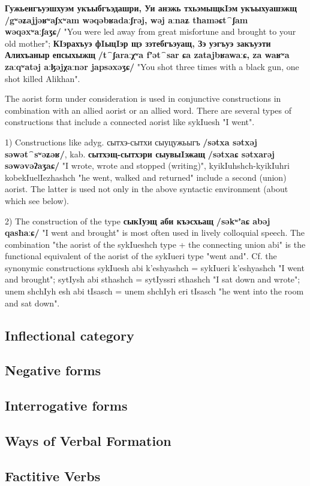 \documentclass[a4paper,12pt]{book}
\newcommand{\1}[1]{\textbf{\emph{#1}}} %
\newcommand{\2}[1]{\textbf{[#1]}} %
\newcommand{\3}[1]{\fontsize{11pt}{0cm}\textbf{\emph{#1}}} %
\newcommand{\4}[1]{\fontsize{10pt}{0cm}\emph{#1}}	%
\newcommand{\5}[1]{\textbf{/#1/}} %
\newcommand{\6}[1]{\textbf{[#1]}} %
\newcommand{\7}[1]{\fontsize{12pt}{0cm}\emph{#1}} %
\newcommand{\8}[1]{\fontsize{12pt}{0cm}`#1'} %
\newcommand{\9}[1]{\fontsize{12pt}{0cm}(lit. `#1')} %
\newcommand{\glossphonemics}[1]{\textbf{/#1/}} %
\begin{document}
\textbf{Гужьеигъуэшхуэм укъыбгъэдашри, Уи анэжь тхьэмыщкIэм укъыхуашэжщ} \glossphonemics{gʷəʑajjəʁʷaʃxʷam wəqəbʁadaːʃrəj, wəj aːnaʑ tħaməɕt⁀ʃam wəqəxʷaːʃaʒɕ} "You were led away from great misfortune and brought to your old mother"; \textbf{КIэрахъуэ фIыцIэр щэ зэтебгъэуащ, Зэ уэгъуэ закъуэти Алихъаныр епсыхыжщ} \glossphonemics{t⁀ʃaraːχʷa fʼət⁀sar ɕa zatajbʁawaːɕ, za waʁʷa zaːqʷatəj aːɮəjχaːnər japsəxəʒɕ} "You shot three times with a black gun, one shot killed Alikhan".

The aorist form under consideration is used in conjunctive constructions in combination with an allied aorist or an allied word. There are several types of constructions that include a connected aorist like sykIuesh "I went".

1) Constructions like adyg. сытхэ-сытхи сыуцужьыгъ \glossphonemics{sətxa sətxəj səwət⁀sʷəʑəʁ}, kab. \textbf{сытхэщ-сытхэри сыувыIэжащ} \glossphonemics{sətxaɕ sətxarəj səwəvəʔaʒaɕ} "I wrote, wrote and stopped (writing)", kyikIuhshch-kyikIuhri kobekIuelIezhashch "he went, walked and returned" include a second (union) aorist. The latter is used not only in the above syntactic environment (about which see below).

2) The construction of the type \textbf{сыкIуэщ аби къэсхьащ} \glossphonemics{səkʷʼaɕ abəj qasħaːɕ} "I went and brought" is most often used in lively colloquial speech. The combination "the aorist of the sykIueshch type + the connecting union abi" is the functional equivalent of the aorist of the sykIueri type "went and". Cf. the synonymic constructions sykIuesh abi k'eshyashch = sykIueri k'eshyashch "I went and brought"; sytIysh abi sthashch = sytIyssri sthashch "I sat down and wrote"; unem shchIyh esh abi tIsasch = unem shchIyh eri tIsasch "he went into the room and sat down".
\subsection{Inflectional category}
\subsection{Negative forms}
\subsection{Interrogative forms}
\subsection{Ways of Verbal Formation}
\subsection{Factitive Verbs}
\end{document}
